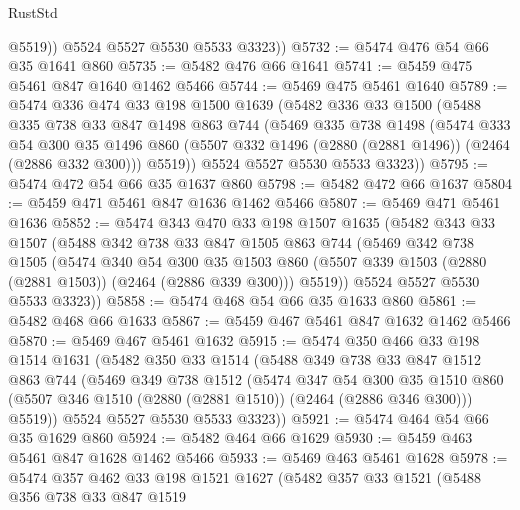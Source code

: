 \begin{lexlean}{RustStd}
\begin{coremodule}
            @5519))
        @5524
        @5527
        @5530
        @5533
        @3323))
@5732 := @5474 @476 @54 @66 @35 @1641 @860
@5735 := @5482 @476 @66 @1641
@5741 := @5459 @475 @5461 @847 @1640 @1462 @5466
@5744 := @5469 @475 @5461 @1640
@5789 := @5474
    @336
    @474
    @33
    @198
    @1500
    @1639
    (@5482
      @336
      @33
      @1500
      (@5488
        @335
        @738
        @33
        @847
        @1498
        @863
        @744
        (@5469
          @335
          @738
          @1498
          (@5474
            @333
            @54
            @300
            @35
            @1496
            @860
            (@5507 @332 @1496 (@2880 (@2881 @1496)) (@2464 (@2886 @332 @300)))
            @5519))
        @5524
        @5527
        @5530
        @5533
        @3323))
@5795 := @5474 @472 @54 @66 @35 @1637 @860
@5798 := @5482 @472 @66 @1637
@5804 := @5459 @471 @5461 @847 @1636 @1462 @5466
@5807 := @5469 @471 @5461 @1636
@5852 := @5474
    @343
    @470
    @33
    @198
    @1507
    @1635
    (@5482
      @343
      @33
      @1507
      (@5488
        @342
        @738
        @33
        @847
        @1505
        @863
        @744
        (@5469
          @342
          @738
          @1505
          (@5474
            @340
            @54
            @300
            @35
            @1503
            @860
            (@5507 @339 @1503 (@2880 (@2881 @1503)) (@2464 (@2886 @339 @300)))
            @5519))
        @5524
        @5527
        @5530
        @5533
        @3323))
@5858 := @5474 @468 @54 @66 @35 @1633 @860
@5861 := @5482 @468 @66 @1633
@5867 := @5459 @467 @5461 @847 @1632 @1462 @5466
@5870 := @5469 @467 @5461 @1632
@5915 := @5474
    @350
    @466
    @33
    @198
    @1514
    @1631
    (@5482
      @350
      @33
      @1514
      (@5488
        @349
        @738
        @33
        @847
        @1512
        @863
        @744
        (@5469
          @349
          @738
          @1512
          (@5474
            @347
            @54
            @300
            @35
            @1510
            @860
            (@5507 @346 @1510 (@2880 (@2881 @1510)) (@2464 (@2886 @346 @300)))
            @5519))
        @5524
        @5527
        @5530
        @5533
        @3323))
@5921 := @5474 @464 @54 @66 @35 @1629 @860
@5924 := @5482 @464 @66 @1629
@5930 := @5459 @463 @5461 @847 @1628 @1462 @5466
@5933 := @5469 @463 @5461 @1628
@5978 := @5474
    @357
    @462
    @33
    @198
    @1521
    @1627
    (@5482
      @357
      @33
      @1521
      (@5488
        @356
        @738
        @33
        @847
        @1519

\end{coremodule}
\end{lexlean}
